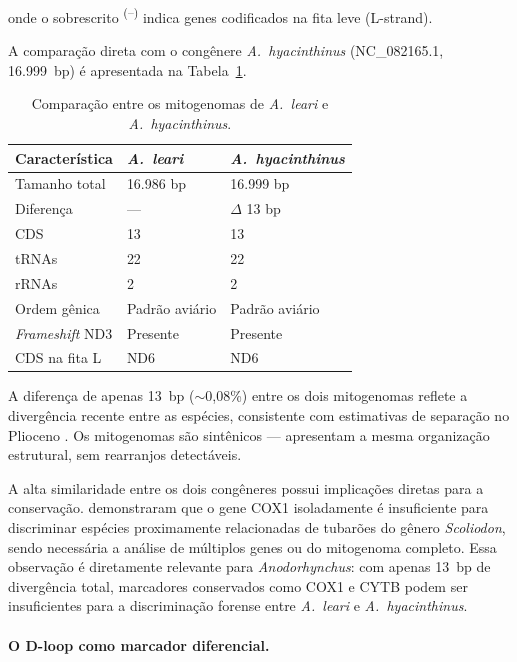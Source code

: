 \noindent onde o sobrescrito \textsuperscript{(--)} indica genes codificados na fita leve (L-strand).

A comparação direta com o congênere \textit{A.~hyacinthinus} (NC\_082165.1, 16.999~bp) é apresentada na Tabela~\ref{tab:comparacao_hyacinthinus}.

\begin{table}[H]
\centering
\caption{Comparação entre os mitogenomas de \textit{A.~leari} e \textit{A.~hyacinthinus}.}
\label{tab:comparacao_hyacinthinus}
\begin{tabular}{@{}lll@{}}
\toprule
\textbf{Característica} & \textbf{\textit{A.~leari}} & \textbf{\textit{A.~hyacinthinus}} \\
\midrule
Tamanho total   & 16.986 bp & 16.999 bp \\
Diferença       & ---       & $\Delta$ 13 bp \\
CDS             & 13        & 13 \\
tRNAs           & 22        & 22 \\
rRNAs           & 2         & 2 \\
Ordem gênica    & Padrão aviário & Padrão aviário \\
\textit{Frameshift} ND3 & Presente & Presente \\
CDS na fita L   & ND6       & ND6 \\
\bottomrule
\end{tabular}
\end{table}

A diferença de apenas 13~bp ($\sim$0,08\%) entre os dois mitogenomas reflete a divergência recente entre as espécies, consistente com estimativas de separação no Plioceno \cite{tavares2006}. Os mitogenomas são sintênicos --- apresentam a mesma organização estrutural, sem rearranjos detectáveis.

A alta similaridade entre os dois congêneres possui implicações diretas para a conservação.  demonstraram que o gene COX1 isoladamente é insuficiente para discriminar espécies proximamente relacionadas de tubarões do gênero \textit{Scoliodon}, sendo necessária a análise de múltiplos genes ou do mitogenoma completo. Essa observação é diretamente relevante para \textit{Anodorhynchus}: com apenas 13~bp de divergência total, marcadores conservados como COX1 e CYTB podem ser insuficientes para a discriminação forense entre \textit{A.~leari} e \textit{A.~hyacinthinus}.

\paragraph*{O D-loop como marcador diferencial.}

